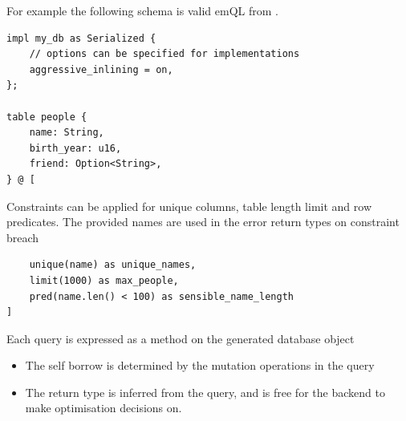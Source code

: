 For example the following schema is valid emQL from .
\begin{verbatim}
impl my_db as Serialized { 
    // options can be specified for implementations
    aggressive_inlining = on,
};

table people {
    name: String,
    birth_year: u16,
    friend: Option<String>,
} @ [
\end{verbatim}
Constraints can be applied for unique columns, table length limit and row predicates. The provided names are used in the error return types on constraint breach
\begin{verbatim}
    unique(name) as unique_names, 
    limit(1000) as max_people, 
    pred(name.len() < 100) as sensible_name_length 
]
\end{verbatim}
Each query is expressed as a method on the generated database object
\begin{itemize}
    \setlength\itemsep{0em}
    \item The self borrow is determined by the mutation operations in the query
    \item The return type is inferred from the query, and is free for the backend to make optimisation decisions on.
\end{itemize}
